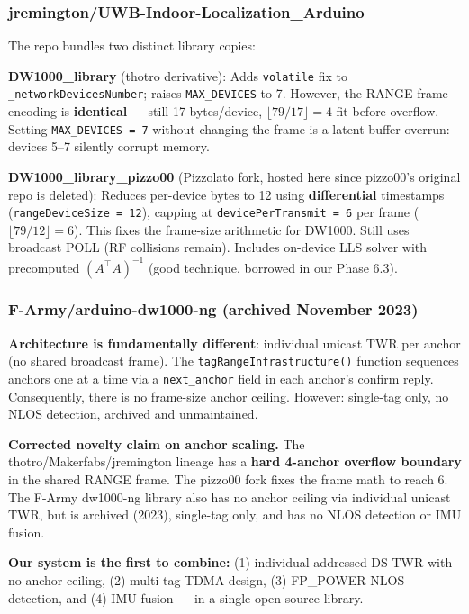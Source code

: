 \documentclass[11pt,a4paper]{article}
\begin{document}
\subsubsection{jremington/UWB-Indoor-Localization\_Arduino}

The repo bundles two distinct library copies:

\textbf{DW1000\_library} (thotro derivative): Adds \texttt{volatile} fix to \texttt{\_networkDevicesNumber}; raises \texttt{MAX\_DEVICES} to 7. However, the RANGE frame encoding is \textbf{identical} --- still 17 bytes/device, $\lfloor79/17\rfloor = 4$ fit before overflow. Setting \texttt{MAX\_DEVICES = 7} without changing the frame is a latent buffer overrun: devices 5--7 silently corrupt memory.

\textbf{DW1000\_library\_pizzo00} (Pizzolato fork, hosted here since pizzo00's original repo is deleted): Reduces per-device bytes to 12 using \textbf{differential} timestamps (\texttt{rangeDeviceSize = 12}), capping at \texttt{devicePerTransmit = 6} per frame ($\lfloor79/12\rfloor = 6$). This fixes the frame-size arithmetic for DW1000. Still uses broadcast POLL (RF collisions remain). Includes on-device LLS solver with precomputed $(A^\top A)^{-1}$ (good technique, borrowed in our Phase 6.3).

\subsubsection{F-Army/arduino-dw1000-ng (archived November 2023)}

\textbf{Architecture is fundamentally different}: individual unicast TWR per anchor (no shared broadcast frame). The \texttt{tagRangeInfrastructure()} function sequences anchors one at a time via a \texttt{next\_anchor} field in each anchor's confirm reply. Consequently, there is no frame-size anchor ceiling. However: single-tag only, no NLOS detection, archived and unmaintained.

\begin{claimbox}
\textbf{Corrected novelty claim on anchor scaling.} The thotro/Makerfabs/jremington lineage has a \textbf{hard 4-anchor overflow boundary} in the shared RANGE frame. The pizzo00 fork fixes the frame math to reach 6. The F-Army dw1000-ng library also has no anchor ceiling via individual unicast TWR, but is archived (2023), single-tag only, and has no NLOS detection or IMU fusion.

\textbf{Our system is the first to combine:} (1) individual addressed DS-TWR with no anchor ceiling, (2) multi-tag TDMA design, (3) FP\_POWER NLOS detection, and (4) IMU fusion --- in a single open-source library.
\end{claimbox}
\end{document}
